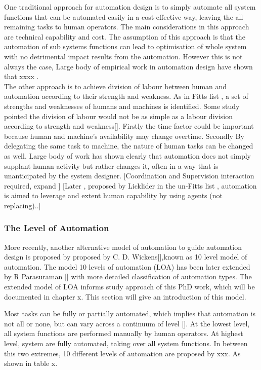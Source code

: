 One traditional approach for automation design is to simply automate all system functions that can be automated easily in a cost-effective way, leaving the all remaining tasks to human operators. The main considerations in this approach are technical capability and cost. The assumption of this approach is that the automation of sub systems functions can lead to optimisation of whole system with no detrimental impact results from the automation. However this is not always the case, Large body of empirical work in automation design have shown that xxxx .\\ 

The other approach is to achieve division of labour between human and automation according to their strength and weakness. As in Fitts list \cite{Fitts} , a set of strengths and weaknesses of humans and machines is identified. Some study pointed the division of labour would not be as simple as a labour division according to strength and weakness[]. Firstly the time factor could be important because human and machine's availability may change overtime. Secondly By delegating the same task to machine, the nature of human tasks can be changed as well. Large body of work has shown clearly that automation does not simply supplant human activity but rather changes it, often in a way that is unanticipated by the system designer. [Coordination and Supervision interaction required, expand ] \cite{Bradshaw2011} [Later , proposed by Licklider in the un-Fitts list \cite{Hoffman2002}, automation is aimed to leverage and extent human capability by using agents (not replacing).\cite{Bradshaw2011}.] \\

\subsubsection{The Level of Automation}
More recently, another alternative model of automation to guide automation design is proposed by proposed by C. D. Wickens[],known as 10 level model of automation. The model 10 levels of automation (LOA) has been later extended by R Parasuraman [] with more detailed classification of automation types. The extended model of LOA informs study approach of this PhD work, which will be documented in chapter x. This section will give an introduction of this model. 


Most tasks can be fully or partially automated, which implies that automation is not all or none, but can vary across a continuum of level []. At the lowest level, all system functions are performed manually by human operators.  At highest level, system are fully automated, taking over all system functions. In between this two extremes, 10 different levels of automation are proposed by xxx. As shown in table x. 

